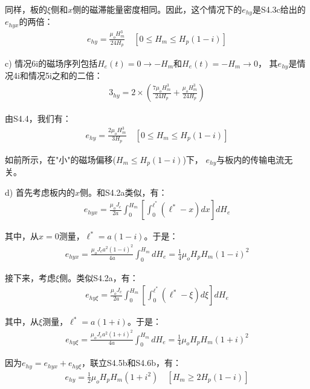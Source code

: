 同样，板的$\xi$侧和$x$侧的磁滞能量密度相同。因此，这个情况下的$e_{hy}$是S4.3c给出的$e_{hyx}$的两倍：
\begin{align*}%
e_{hy}=\frac{\mu_oH_{m}^{3}}{24H_p}   \quad     [0\leq H_m\leq H_p(1-i)] \tag{7.22b}
\end{align*}

c) 情况6i的磁场序列包括$H_e(t)=0\rightarrow -H_m$和$H_e(t)=-H_m\rightarrow 0$，
其$e_{hy}$是情况4i和情况5i之和的二倍：
\begin{align*}%
3_{hy}=2\times\left(\frac{7\mu_oH_{m}^{3}}{24H_p}+\frac{\mu_oH_{m}^{3}}{24H_p}\right) \tag{S4.4}
\end{align*}

由S4.4，我们有：
\begin{align*}%
e_{hy}=\frac{2\mu_oH_{m}^{3}}{3H_p} \quad [0\leq H_m\leq H_p(1-i)] \tag{7.22c}
\end{align*}

如前所示，在"小"的磁场偏移($H_m\le H_p(1-i)$)下，
$e_{hy}$与板内的传输电流无关。

d) 首先考虑板内的$x$侧。和S4.2a类似，有：
\begin{align*}%
e_{hyx}=\frac{\mu_oJ_c}{2a}\int_{0}^{H_m}\left[\int_{0}^{\ell^*}(\ell^*-x)dx\right]dH_e \tag{4.5a}
\end{align*}

其中，从$x=0$测量，$\ell^*=a(1-i)$。于是：
\begin{align*}%
e_{hyx}=\frac{\mu_oJ_ca^2(1-i)^2}{4a}\int_{0}^{H_m}dH_e=\frac{1}{4}\mu_oH_pH_m(1-i)^2 \tag{S4.5b}
\end{align*}

接下来，考虑$\xi$侧。类似S4.2a，有：
\begin{align*}%
e_{hy\xi}=\frac{\mu_oJ_c}{2a}\int_{0}^{H_m}\left[\int_{0}^{\ell^*}(\ell^*-\xi)d\xi\right]dH_e \tag{S4.6a}
\end{align*}

其中，从$\xi$测量，$\ell^*=a(1+i)$。于是：
\begin{align*}%
e_{hy\xi}=\frac{\mu_oJ_ca^2(1+i)^2}{4a}\int_{0}^{H_m}dH_e=\frac{1}{4}\mu_oH_pH_m(1+i)^2\tag{S4.6b}
\end{align*}

因为$e_{hy}=e_{hyx}+e_{hy\xi}$，联立S4.5b和S4.6b，有：
\begin{align*}%
e_{hy}=\frac{1}{2}\mu_oH_pH_m(1+i^2) \quad [H_m\geq 2H_p(1-i)] \tag{7.23a}
\end{align*}

